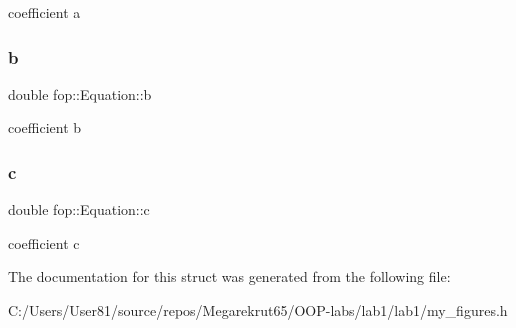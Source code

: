 coefficient a \mbox{\label{structfop_1_1_equation_a6bf704c5c87c9a321c18869f634a5ff1}} 
\subsubsection{\texorpdfstring{b}{b}}
{\footnotesize\ttfamily double fop\+::\+Equation\+::b}

coefficient b \mbox{\label{structfop_1_1_equation_a795ea1202f12b407544c305d79e39872}} 
\subsubsection{\texorpdfstring{c}{c}}
{\footnotesize\ttfamily double fop\+::\+Equation\+::c}

coefficient c 

The documentation for this struct was generated from the following file\+:\begin{DoxyCompactItemize}
\item 
C\+:/\+Users/\+User81/source/repos/\+Megarekrut65/\+O\+O\+P-\/labs/lab1/lab1/my\+\_\+figures.\+h\end{DoxyCompactItemize}
